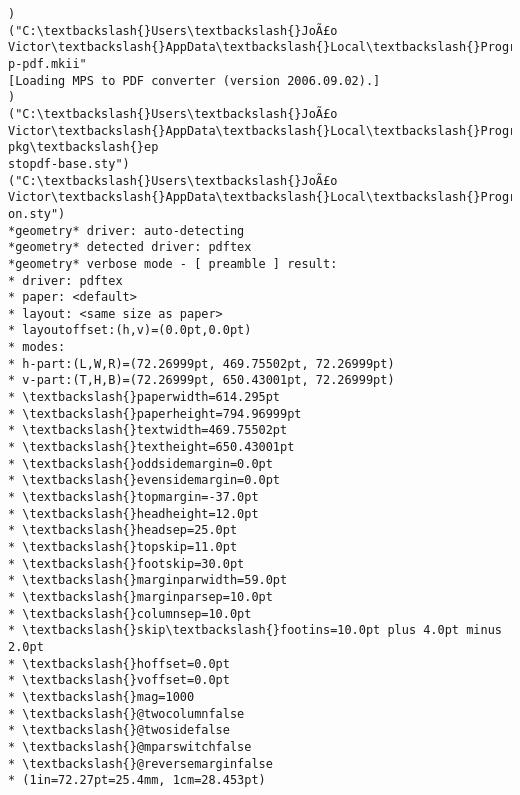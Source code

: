 \documentclass[11pt]{article}
\begin{document}
\begin{Verbatim}[commandchars=\\\{\}]
)
("C:\textbackslash{}Users\textbackslash{}JoÃ£o Victor\textbackslash{}AppData\textbackslash{}Local\textbackslash{}Programs\textbackslash{}MiKTeX\textbackslash{}tex/context/base/mkii\textbackslash{}sup
p-pdf.mkii"
[Loading MPS to PDF converter (version 2006.09.02).]
)
("C:\textbackslash{}Users\textbackslash{}JoÃ£o Victor\textbackslash{}AppData\textbackslash{}Local\textbackslash{}Programs\textbackslash{}MiKTeX\textbackslash{}tex/latex/epstopdf-pkg\textbackslash{}ep
stopdf-base.sty")
("C:\textbackslash{}Users\textbackslash{}JoÃ£o Victor\textbackslash{}AppData\textbackslash{}Local\textbackslash{}Programs\textbackslash{}MiKTeX\textbackslash{}tex/latex/caption\textbackslash{}ltcapti
on.sty")
*geometry* driver: auto-detecting
*geometry* detected driver: pdftex
*geometry* verbose mode - [ preamble ] result:
* driver: pdftex
* paper: <default>
* layout: <same size as paper>
* layoutoffset:(h,v)=(0.0pt,0.0pt)
* modes:
* h-part:(L,W,R)=(72.26999pt, 469.75502pt, 72.26999pt)
* v-part:(T,H,B)=(72.26999pt, 650.43001pt, 72.26999pt)
* \textbackslash{}paperwidth=614.295pt
* \textbackslash{}paperheight=794.96999pt
* \textbackslash{}textwidth=469.75502pt
* \textbackslash{}textheight=650.43001pt
* \textbackslash{}oddsidemargin=0.0pt
* \textbackslash{}evensidemargin=0.0pt
* \textbackslash{}topmargin=-37.0pt
* \textbackslash{}headheight=12.0pt
* \textbackslash{}headsep=25.0pt
* \textbackslash{}topskip=11.0pt
* \textbackslash{}footskip=30.0pt
* \textbackslash{}marginparwidth=59.0pt
* \textbackslash{}marginparsep=10.0pt
* \textbackslash{}columnsep=10.0pt
* \textbackslash{}skip\textbackslash{}footins=10.0pt plus 4.0pt minus 2.0pt
* \textbackslash{}hoffset=0.0pt
* \textbackslash{}voffset=0.0pt
* \textbackslash{}mag=1000
* \textbackslash{}@twocolumnfalse
* \textbackslash{}@twosidefalse
* \textbackslash{}@mparswitchfalse
* \textbackslash{}@reversemarginfalse
* (1in=72.27pt=25.4mm, 1cm=28.453pt)


\end{Verbatim}
\end{document}
